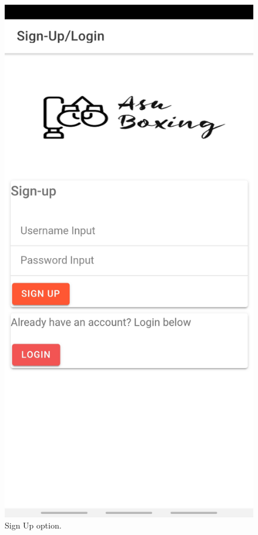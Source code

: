\documentclass[a4paper,12pt]{report}
\begin{document}
\begin{figure}[ht] 
  \begin{minipage}[b]{0.5\linewidth}
    \centering
    \includegraphics[width=.7\linewidth]{images/aplicationImages/logInSignIn.jpeg} 
    \caption{Sign Up option.} 
    \vspace{4ex}
  \end{minipage}%
  \begin{minipage}[b]{0.5\linewidth}
    \centering

\end{minipage}
\end{figure}
\end{document}
